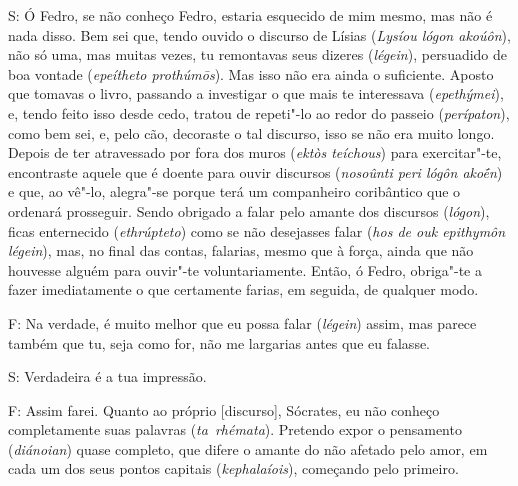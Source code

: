S: Ó Fedro, se não conheço Fedro, estaria esquecido de mim
mesmo, mas não
é nada disso. Bem sei que, tendo ouvido o discurso de Lísias
(\emph{Lysíou lógon akoúôn}), não só uma, mas muitas vezes, tu
remontavas seus dizeres (\emph{légein}), persuadido de boa vontade
(\emph{epeítheto prothúmōs}). Mas isso não \bekker{[228b]} era ainda o
suficiente. Aposto que tomavas o livro, passando a investigar o que mais
te interessava (\emph{epethýmei}), e, tendo feito isso desde cedo,
tratou de repeti"-lo ao redor do passeio (\emph{perípaton}), como bem
sei, e, pelo cão, decoraste o tal discurso, isso se não era muito
longo. Depois de ter atravessado por fora
dos muros (\emph{ektòs teíchous}) para exercitar"-te, encontraste aquele
que é doente para ouvir discursos (\emph{nosoûnti peri lógôn akoḗn}) e
que, ao vê"-lo, alegra"-se porque terá um companheiro coribântico que o
ordenará prosseguir. Sendo obrigado a falar pelo \bekker{[228c]} amante dos
discursos (\emph{lógon}), ficas enternecido (\emph{ethrúpteto}) como se
não desejasses falar (\emph{hos de ouk epithymôn légein}), mas, no final
das contas, falarias, mesmo que à força, ainda que não houvesse alguém
para ouvir"-te voluntariamente. Então, ó Fedro, obriga"-te a fazer
imediatamente o que certamente farias, em seguida, de qualquer modo.

F: Na verdade, é muito melhor que eu possa falar (\emph{légein}) assim,
mas parece também que tu, seja como for, não me largarias antes que eu
falasse.

 

S: Verdadeira é a tua impressão.

 

\bekker{[228d]} F: Assim farei. Quanto ao próprio [discurso], Sócrates,
eu não conheço completamente suas palavras (\emph{ta}~\emph{rhémata}).
Pretendo expor o pensamento (\emph{diánoian}) quase completo, que difere
o amante do não afetado pelo amor, em cada um dos seus pontos capitais
(\emph{kephalaíois}), começando pelo primeiro.

 

